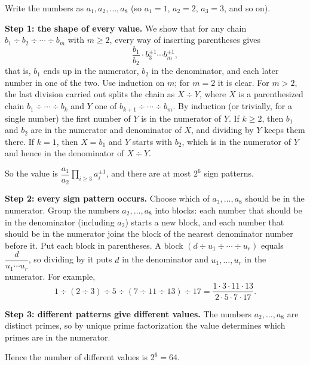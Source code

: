 Write the numbers as $a_1,a_2,\dots,a_{8}$ (so $a_1=1$, $a_2=2$, $a_3=3$, and so on).

\textbf{Step 1: the shape of every value.} We show that for any chain $b_1\div b_2\div\cdots\div b_m$ with $m\ge2$, every way of inserting parentheses gives
\[
\dfrac{b_1}{b_2}\cdot b_3^{\pm1}\cdots b_m^{\pm1},
\]
that is, $b_1$ ends up in the numerator, $b_2$ in the denominator, and each later number in one of the two. Use induction on $m$; for $m=2$ it is clear. For $m>2$, the last division carried out splits the chain as $X\div Y$, where $X$ is a parenthesized chain $b_1\div\cdots\div b_k$ and $Y$ one of $b_{k+1}\div\cdots\div b_m$. By induction (or trivially, for a single number) the first number of $Y$ is in the numerator of $Y$. If $k\ge2$, then $b_1$ and $b_2$ are in the numerator and denominator of $X$, and dividing by $Y$ keeps them there. If $k=1$, then $X=b_1$ and $Y$ starts with $b_2$, which is in the numerator of $Y$ and hence in the denominator of $X\div Y$.

So the value is $\dfrac{a_1}{a_2}\prod_{i\ge3}a_i^{\pm1}$, and there are at most $2^{6}$ sign patterns.

\textbf{Step 2: every sign pattern occurs.} Choose which of $a_3,\dots,a_{8}$ should be in the numerator. Group the numbers $a_2,\dots,a_{8}$ into blocks: each number that should be in the denominator (including $a_2$) starts a new block, and each number that should be in the numerator joins the block of the nearest denominator number before it. Put each block in parentheses. A block $(d\div u_1\div\cdots\div u_r)$ equals $\dfrac{d}{u_1\cdots u_r}$, so dividing by it puts $d$ in the denominator and $u_1,\dots,u_r$ in the numerator. For example,
\[
1\div(2\div3)\div5\div(7\div11\div13)\div17=\dfrac{1\cdot3\cdot11\cdot13}{2\cdot5\cdot7\cdot17} .
\]

\textbf{Step 3: different patterns give different values.} The numbers $a_2,\dots,a_{8}$ are distinct primes, so by unique prime factorization the value determines which primes are in the numerator.

Hence the number of different values is $2^{6}=\boxed{64}$.
